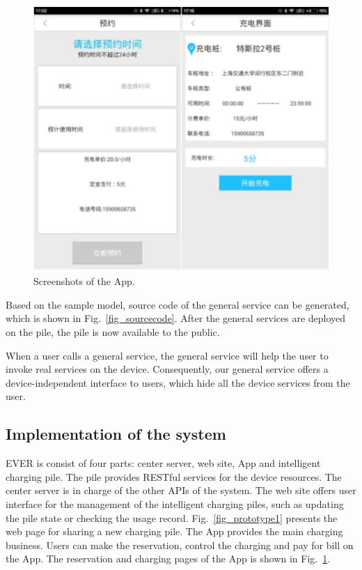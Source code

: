 \begin{figure}[!t]
\centering
\includegraphics[width=1.0\linewidth]{./graph/app}
\caption{Screenshots of the App.}
\label{fig_app}
\end{figure}

Based on the sample model, source code of the general service can be generated, which is shown in Fig.~\ref{fig_sourcecode}. After the general services are deployed on the pile, the pile is now available to the public. 

When a user calls a general service, the general service will help the user to invoke real services on the device. Consequently, our general service offers a device-independent interface to users, which hide all the device services from the user. 

\subsection{Implementation of the system}
EVER is consist of four parts: center server, web site, App and intelligent charging pile. The pile provides RESTful services for the device resources. The center server is in charge of the other APIs of the system. The web site offers user interface for the management of the intelligent charging piles, such as updating the pile state or checking the usage record. Fig.~\ref{fig_prototype1} presents the web page for sharing a new charging pile. The App provides the main charging business. Users can make the reservation, control the charging and pay for bill on the App. The reservation and charging pages of the App is shown in Fig.~\ref{fig_app}. 



